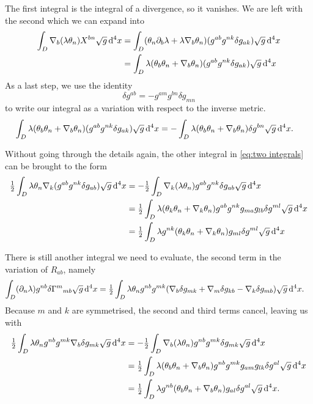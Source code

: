 \documentclass[../main.tex]{subfiles}
\begin{document}
The first integral is the integral of a divergence, so it vanishes. We are left with the
second which we can expand into
\begin{align*}
	\int_D \nabla_b(\lambda \theta_n) X^{bn}\sqrt{g}\,\mathrm{d}^4 x 
	& = \int_D (\theta_n \partial_b \lambda + \lambda \nabla_b\theta_n)(g^{ab}g^{nk}\delta
	g_{ak})\sqrt{g} \,\mathrm{d}^4 x \\
	& = \int_D \lambda(\theta_b\theta_n +
	\nabla_b\theta_n)(g^{ab}g^{nk}\delta g_{ak})\sqrt{g}\,\mathrm{d}^4 x
\end{align*}
As a last step, we use the identity
\begin{equation*}
	\delta g^{ab} = - g^{am}g^{bn} \delta g_{mn}
\end{equation*}
to write our integral as a variation with respect to the inverse metric.
\begin{align*}
	\int_D \lambda(\theta_b\theta_n + \nabla_b\theta_n)(g^{ab}g^{nk}\delta
	g_{ak})\sqrt{g}\,\mathrm{d}^4 x 
	& = -\int_D \lambda(\theta_b\theta_n + \nabla_b \theta_n)\delta g^{bn} \sqrt{g} \,\mathrm{d}^4 x. 
\end{align*}

Without going through the details again, the other integral in \cref{eq:two integrals} can
be brought to the form
\begin{align*} 
	\tfrac{1}{2} \int_D \lambda \theta_n \nabla_k (g^{ab}g^{nk}\delta g_{ab}) \sqrt{g} \,\mathrm{d}^4
	x 
	& = - \tfrac{1}{2} \int_D \nabla_k(\lambda \theta_n) g^{ab}g^{nk}\delta g_{ab} \sqrt{g}
	\,\mathrm{d}^4 x \\
	& = \tfrac{1}{2} \int_D \lambda(\theta_k\theta_n + \nabla_k\theta_n) g^{ab}g^{nk}
	g_{ma}g_{lb}\delta g^{ml} \sqrt{g}\,\mathrm{d}^4 x \\
	& = \tfrac{1}{2}\int_D \lambda g^{nk}(\theta_k\theta_n + \nabla_k \theta_n)g_{ml} \delta
	g^{ml} \sqrt{g} \,\mathrm{d}^4 x
\end{align*}

There is still another integral we need to evaluate, the second term in the variation of
\( R_{ab} \), namely
\begin{align}
	\int_D (\partial_n \lambda) g^{nb}\delta{\Gamma^m}_{mb} \sqrt{g} \,\mathrm{d}^4 x 
	& = \tfrac{1}{2} \int_D \lambda \theta_n g^{nb} g^{mk}(\nabla_b \delta g_{mk} + \nabla_m
	\delta g_{kb} - \nabla_k \delta g_{mb}) \sqrt{g} \,\mathrm{d}^4 x. 
\end{align}
Because \( m \) and \( k \) are symmetrised, the second and third terms cancel, leaving
us with
\begin{align}
	\tfrac{1}{2}\int_D \lambda \theta_n g^{nb}g^{mk}\nabla_b \delta g_{mk} \sqrt{g} \,\mathrm{d}^4 x
	& = - \tfrac{1}{2} \int_D \nabla_b(\lambda \theta_n) g^{nb}g^{mk} \delta g_{mk} \sqrt{g}
	\,\mathrm{d}^4 x \\
	& = \tfrac{1}{2} \int_D \lambda(\theta_b\theta_n + \nabla_b
	\theta_n)g^{nb}g^{mk}g_{am}g_{lk}\delta g^{al} \sqrt{g} \,\mathrm{d}^4 x \\
	& = \tfrac{1}{2} \int_D \lambda g^{nb}(\theta_b \theta_n + \nabla_b \theta_n)
	g_{al} \delta g^{al} \sqrt{g} \,\mathrm{d}^4 x. 
\end{align}
\end{document}

